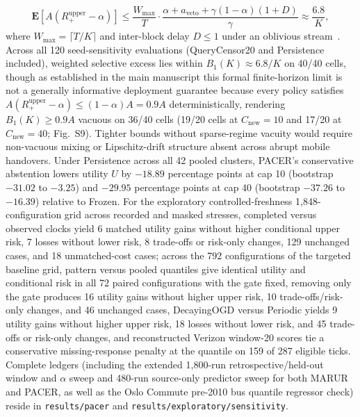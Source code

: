 \documentclass[journal,onecolumn,10pt]{IEEEtran}
\begin{document}
\begin{equation}
\mathbf{E}\!\left[A\left(R_+^{\text{upper}} - \alpha\right)\right] \le \frac{W_{\max}}{T} \cdot \frac{\alpha + a_{\text{veto}} + \gamma(1 - \alpha)(1 + D)}{\gamma} \approx \frac{6.8}{K},
\label{eq:supp_t1}
\end{equation}
where $W_{\max}=\lceil T/K \rceil$ and inter-block delay $D \le 1$ under an oblivious stream~\cite{vovk2005algorithmic}. Across all 120 seed-sensitivity evaluations (QueryCensor20 and Persistence included), weighted selective excess lies within $B_1(K) \approx 6.8/K$ on 40/40 cells, though as established in the main manuscript this formal finite-horizon limit is not a generally informative deployment guarantee because every policy satisfies $A(R_+^{\text{upper}}-\alpha) \le (1-\alpha)A = 0.9A$ deterministically, rendering $B_1(K) \ge 0.9A$ vacuous on 36/40 cells (19/20 cells at $C_{\text{new}}=10$ and 17/20 at $C_{\text{new}}=40$; Fig.~S9). Tighter bounds without sparse-regime vacuity would require non-vacuous mixing or Lipschitz-drift structure absent across abrupt mobile handovers. Under Persistence across all 42 pooled clusters, PACER's conservative abstention lowers utility $U$ by $-18.89$ percentage points at cap 10 (bootstrap $-31.02$ to $-3.25$) and $-29.95$ percentage points at cap 40 (bootstrap $-37.26$ to $-16.39$) relative to Frozen. For the exploratory controlled-freshness 1,848-configuration grid across recorded and masked stresses, completed versus observed clocks yield 6 matched utility gains without higher conditional upper risk, 7 losses without lower risk, 8 trade-offs or risk-only changes, 129 unchanged cases, and 18 unmatched-cost cases; across the 792 configurations of the targeted baseline grid, pattern versus pooled quantiles give identical utility and conditional risk in all 72 paired configurations with the gate fixed, removing only the gate produces 16 utility gains without higher upper risk, 10 trade-offs/risk-only changes, and 46 unchanged cases, DecayingOGD versus Periodic yields 9 utility gains without higher upper risk, 18 losses without lower risk, and 45 trade-offs or risk-only changes, and reconstructed Verizon window-20 scores tie a conservative missing-response penalty at the quantile on 159 of 287 eligible ticks. Complete ledgers (including the extended 1,800-run retrospective/held-out window and $\alpha$ sweep and 480-run source-only predictor sweep for both MARUR and PACER, as well as the Oslo Commute pre-2010 bus quantile regressor check) reside in \texttt{results/pacer} and \texttt{results/exploratory/sensitivity}.
\end{document}
